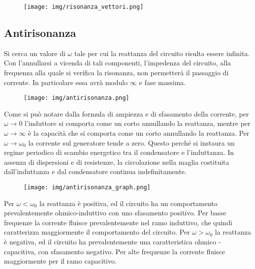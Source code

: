 \documentclass{article}
\begin{document}
\begin{figure}[h!]
    \begin{center}
        \texttt{[image: img/risonanza\_vettori.png]}
    \end{center}
\end{figure}

\subsection{Antirisonanza}
\medskip

\noindent{}
\medskip

\noindent Si cerca un valore di $\omega$ tale per cui la reattanza del circuito risulta essere infinita.
Con l'annullarsi a vicenda di tali componenti, l'impedenza del circuito, alla frequenza alla quale si verifica la risonanza, non permetterà
il passaggio di corrente. In particolare essa avrà modulo $\infty$ e fase massima. 


\begin{figure}[h!]
    \begin{center}
        \texttt{[image: img/antirisonanza.png]}
    \end{center}
\end{figure}

\noindent Come si può notare dalla formula di ampiezza e di sfasamento della corrente, per $\omega\rightarrow0$ l'induttore si comporta
come un corto annullando la reattanza, mentre per $\omega\rightarrow\infty$ è la capacità che si comporta
come un corto annullando la reattanza. Per $\omega\rightarrow\omega_0$ la corrente sul generatore tende a zero.
Questo perché si instaura  un regime periodico di scambio energetico tra il condensatore e l'induttanza. In assenza di dispersioni e di
 resistenze, la circolazione nella maglia costituita dall'induttanza e dal condensatore continua indefinitamente.


\begin{figure}[h!]
    \begin{center}
        \texttt{[image: img/antirisonanza\_graph.png]}
    \end{center}
\end{figure}

\noindent Per $\omega < \omega_0$ la reattanza è positiva, ed il circuito ha un comportamento prevalentemente ohmico-induttivo con
 uno sfasamento positivo. Per basse frequenze la corrente fluisce prevalentemente nel ramo induttivo, che quindi caratterizza 
 maggiormente il comportamento del circuito. Per $\omega > \omega_0$ la reattanza è negativa, ed il circuito ha
prevalentemente una caratteristica ohmico - capacitiva, con sfasamento negativo. Per alte frequenze la
corrente fluisce maggiormente per il ramo capacitivo.
\end{document}
